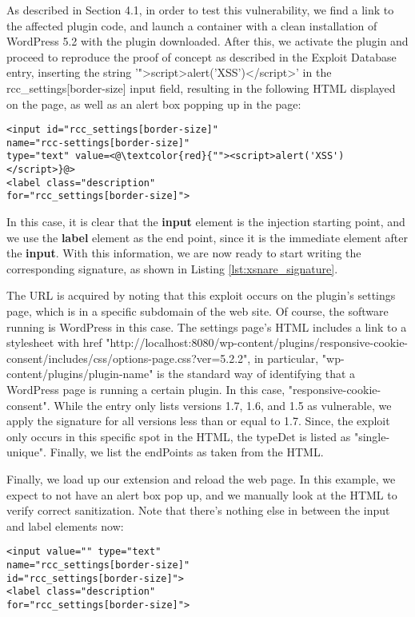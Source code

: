  As described in Section 4.1, in order to test this vulnerability, we find a link to the affected plugin code, and launch a container with a clean installation of WordPress 5.2 with the plugin downloaded. After this, we activate the plugin and proceed to reproduce the proof of concept as described in the Exploit Database entry, inserting the string '">script>alert('XSS')</script>' in the rcc\_settings[border-size] input field, resulting in the following HTML displayed on the page, as well as an alert box popping up in the page:

\begin{lstlisting}
<input id="rcc_settings[border-size]" 
name="rcc-settings[border-size]" 
type="text" value=<@\textcolor{red}{""><script>alert('XSS')</script>}@>
<label class="description"
for="rcc_settings[border-size]">
\end{lstlisting}

In this case, it is clear that the \textbf{input} element is the injection starting point, and we use the \textbf{label} element as the end point, since it is the immediate element after the \textbf{input}. With this information, we are now ready to start writing the corresponding signature, as shown in Listing \ref{lst:xsnare_signature}.

\iffalse
 \lstset{basicstyle=\small}
\begin{lstlisting}
url: 'wp-admin/options-general.php?page=rcc-settings',
software: 'WordPress',
softwareDetails: 'responsive-cookie-consent',
version: '1.7',
type: 'string',
typeDet: 'single-unique',
endPoints: 
['<input id="rcc_settings[border-size]" 
name="rcc_settings[border-size]" type="text"',
'<label class="description" 
for="rcc_settings[border-size]">']
\end{lstlisting}
\fi

The URL is acquired by noting that this exploit occurs on the plugin's settings page, which is in a specific subdomain of the web site. Of course, the software running is WordPress in this case. The settings page's HTML includes a link to a stylesheet with href "http://localhost:8080/wp-content/plugins/responsive-cookie-consent/includes/css/options-page.css?ver=5.2.2", in particular, "wp-content/plugins/plugin-name" is the standard way of identifying that a WordPress page is running a certain plugin. In this case, "responsive-cookie-consent". While the entry only lists versions 1.7, 1.6, and 1.5 as vulnerable, we apply the signature for all versions less than or equal to 1.7.
Since, the exploit only occurs in this specific spot in the HTML, the typeDet is listed as "single-unique". Finally, we list the endPoints as taken from the HTML.

Finally, we load up our extension and reload the web page. In this example, we expect to not have an alert box pop up, and we manually look at the HTML to verify correct sanitization. Note that there's nothing else in between the input and label elements now:

\begin{lstlisting}
<input value="" type="text" 
name="rcc_settings[border-size]" 
id="rcc_settings[border-size]">
<label class="description"
for="rcc_settings[border-size]">
\end{lstlisting}

\fi
